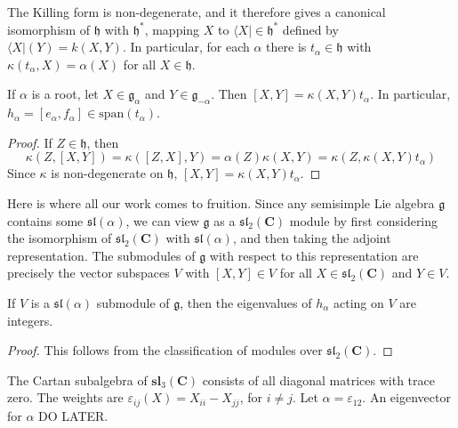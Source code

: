 The Killing form is non-degenerate, and it therefore gives a canonical isomorphism of $\mathfrak{h}$ with $\mathfrak{h}^*$, mapping $X$ to $\langle X | \in \mathfrak{h}^*$ defined by $\langle X| (Y) = k(X,Y)$. In particular, for each $\alpha$ there is $t_\alpha \in \mathfrak{h}$ with $\kappa(t_\alpha,X) = \alpha(X)$ for all $X \in \mathfrak{h}$.

\begin{lemma}
    If $\alpha$ is a root, let $X \in \mathfrak{g}_\alpha$ and $Y \in \mathfrak{g}_{-\alpha}$. Then $[X,Y] = \kappa(X,Y) t_\alpha$. In particular, $h_\alpha = [e_\alpha, f_\alpha] \in \text{span}(t_\alpha)$.
\end{lemma}
\begin{proof}
    If $Z \in \mathfrak{h}$, then
    \[ \kappa(Z,[X,Y]) = \kappa([Z,X],Y) = \alpha(Z) \kappa(X,Y) = \kappa(Z, \kappa(X,Y) t_\alpha) \]
    Since $\kappa$ is non-degenerate on $\mathfrak{h}$, $[X,Y] = \kappa(X,Y) t_\alpha$.
\end{proof}

Here is where all our work comes to fruition. Since any semisimple Lie algebra $\mathfrak{g}$ contains some $\mathfrak{sl}(\alpha)$, we can view $\mathfrak{g}$ as a $\mathfrak{sl}_2(\mathbf{C})$ module by first considering the isomorphism of $\mathfrak{sl}_2(\mathbf{C})$ with $\mathfrak{sl}(\alpha)$, and then taking the adjoint representation. The submodules of $\mathfrak{g}$ with respect to this representation are precisely the vector subspaces $V$ with $[X,Y] \in V$ for all $X \in \mathfrak{sl}_2(\mathbf{C})$ and $Y \in V$.

\begin{lemma}
    If $V$ is a $\mathfrak{sl}(\alpha)$ submodule of $\mathfrak{g}$, then the eigenvalues of $h_\alpha$ acting on $V$ are integers.
\end{lemma}
\begin{proof}
    This follows from the classification of modules over $\mathfrak{sl}_2(\mathbf{C})$.
\end{proof}

\begin{example}
    The Cartan subalgebra of $\mathbf{sl}_3(\mathbf{C})$ consists of all diagonal matrices with trace zero. The weights are $\varepsilon_{ij}(X) = X_{ii} - X_{jj}$, for $i \neq j$. Let $\alpha = \varepsilon_{12}$. An eigenvector for $\alpha$ DO LATER.
\end{example}

